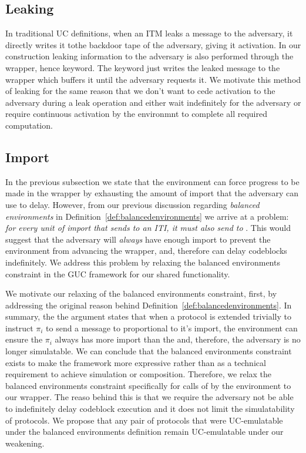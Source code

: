 \subsection{Leaking}
In traditional UC definitions, when an ITM leaks a message to the adversary, it directly writes it tothe backdoor tape of the adversary, giving it activation.
In our construction leaking information to the adversary is also performed through the wrapper, hence \Leak keyword.
The \Leak keyword just writes the leaked message to the wrapper which buffers it until the adversary requests it.
We motivate this method of leaking for the same reason that we don't want to cede activation to the adversary during a leak operation and either wait indefinitely for the adversary or require continuous activation by the environmnt to complete all required computation.

\subsection{Import}
In the previous subsection we state that the environment can force progress to be made in the wrapper by exhausting the amount of import that the adversary can use to delay.
However, from our previous discussion regarding \textit{balanced environments} in Definition~\ref{def:balancedenvironments} we arrive at a problem: \textit{for every unit of import that \Environment sends to an ITI, it must also send to \Adversary}.
This would suggest that the adversary will \textit{always} have enough import to prevent the environment from advancing the wrapper, and, therefore \Adversary can delay codeblocks indefinitely.
We address this problem by relaxing the balanced environments constraint in the GUC framework for our shared functionality.

We motivate our relaxing of the balanced environments constraint, first, by addressing the original reason behind Definition~\ref{def:balancedenvironments}.
In summary, the the argument states that when a protocol is extended trivially to instruct $\pi_i$ to send a message to \Adversary proportional to it's import, the environment can ensure the $\pi_i$ always has more import than the \Adversary and, therefore, the adversary is no longer simulatable. 
We can conclude that the balanced environments constraint exists to make the framework more expressive rather than as a technical requirement to achieve simulation or composition. 
Therefore, we relax the balanced environments constraint specifically for calls of \Advance by the environment to our wrapper.
The reaso behind this is that we require the adversary not be able to indefinitely delay codeblock execution and it does not limit the simulatability of protocols.
We propose that any pair of protocols that were UC-emulatable under the balanced environments definition remain UC-emulatable under our weakening.

